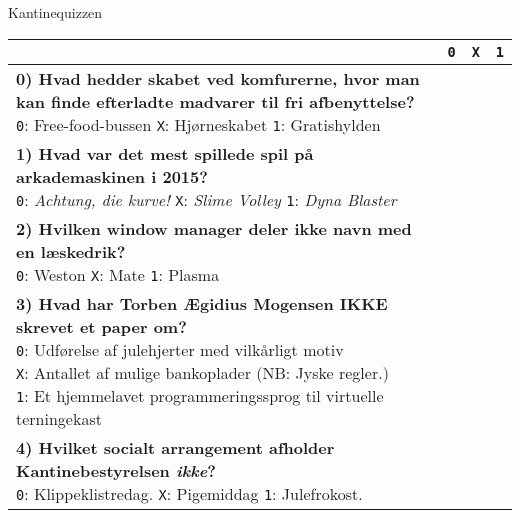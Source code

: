 \documentclass[a4paper]{article}
\begin{document}
\begin{center}
{\Huge Kantinequizzen} \\
\vspace{0.4cm}

\begin{tabular}{|p{12cm}|p{0.2cm}|p{0.2cm}|p{0.2cm}|}
\hline
\vspace{0.2cm}
& \texttt{0} & \texttt{X} & \texttt{1} \\\hline
\parbox{12cm}{
  \vspace{0.2cm}
  \textbf{0) Hvad hedder skabet ved komfurerne, hvor man kan finde
  efterladte madvarer til fri afbenyttelse?} \\
  \texttt{0}: Free-food-bussen \quad
  \texttt{X}: Hjørneskabet \quad
  \texttt{1}: Gratishylden 
  \vspace{0.1cm}
} & & & \\\hline
\parbox{12cm}{
  \vspace{0.2cm}
  \textbf{1) Hvad var det mest spillede spil på arkademaskinen i 2015?} \\
  \texttt{0}: \textit{Achtung, die kurve!}    \quad
  \texttt{X}: \textit{Slime Volley}
  \texttt{1}: \textit{Dyna Blaster} 
  \vspace{0.1cm}
} & & & \\\hline
\parbox{12cm}{
  \vspace{0.2cm}
  \textbf{2) Hvilken window manager deler ikke navn med en læskedrik?} \\
  \texttt{0}: Weston \quad
  \texttt{X}: Mate \quad
  \texttt{1}: Plasma 
  \vspace{0.1cm}
} & & & \\\hline
\parbox{12cm}{
  \vspace{0.2cm}
  \textbf{3) Hvad har Torben Ægidius Mogensen IKKE skrevet et paper om?}\\
  \texttt{0}: Udførelse af julehjerter med vilkårligt motiv \\
  \texttt{X}: Antallet af mulige bankoplader (NB: Jyske regler.) \\
  \texttt{1}: Et hjemmelavet programmeringssprog til virtuelle terningekast
  \vspace{0.1cm}
} & & & \\\hline
\parbox{12cm}{
  \vspace{0.2cm}
  \textbf{4) Hvilket socialt arrangement afholder Kantinebestyrelsen
  \emph{ikke}?} \\
  \texttt{0}: Klippeklistredag. \quad
  \texttt{X}: Pigemiddag \quad
  \texttt{1}: Julefrokost.
  \vspace{0.1cm}
}
\end{tabular}
\end{center}
\end{document}
